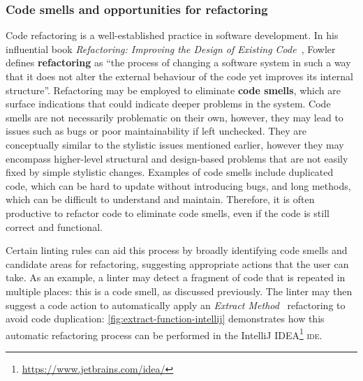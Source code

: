 \documentclass[../../main.tex]{subfiles}
\begin{document}
\subsubsection{Code smells and opportunities for refactoring}
Code refactoring is a well-established practice in software development.
In his influential book \emph{Refactoring: Improving the Design of Existing Code}~\cite{fowler_refactoring_2018}, Fowler defines \textbf{refactoring} as ``the process of changing a software system in such a way that it does not alter the external behaviour of the code yet improves its internal structure''.
Refactoring may be employed to eliminate \textbf{code smells}, which are surface indications that could indicate deeper problems in the system.
Code smells are not necessarily problematic on their own, however, they may lead to issues such as bugs or poor maintainability if left unchecked.
They are conceptually similar to the stylistic issues mentioned earlier, however they may encompass higher-level structural and design-based problems that are not easily fixed by simple stylistic changes.
Examples of code smells include duplicated code, which can be hard to update without introducing bugs, and long methods, which can be difficult to understand and maintain.
Therefore, it is often productive to refactor code to eliminate code smells, even if the code is still correct and functional.

Certain linting rules can aid this process by broadly identifying code smells and candidate areas for refactoring, suggesting appropriate actions that the user can take.
As an example, a linter may detect a fragment of code that is repeated in multiple places: this is a code smell, as discussed previously.
The linter may then suggest a code action to automatically apply an \emph{Extract Method}~\cite{fowler_refactoring_2018} refactoring to avoid code duplication: \cref{fig:extract-function-intellij} demonstrates how this automatic refactoring process can be performed in the IntelliJ IDEA\footnote{\url{https://www.jetbrains.com/idea/}} \textsc{ide}.
\end{document}
